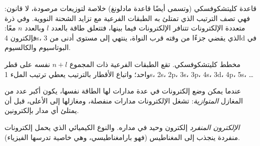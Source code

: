 \begin{remark}\label{rem:b1:quantum-numbers:klech-empirical}
قاعدة كليتشكوفسكي (وتسمى أيضًا قاعدة مادلونغ) خلاصة لتوزيعات مرصودة، لا
قانون: فهي تصف الترتيب الذي تمتلئ به الطبقات الفرعية مع تزايد الشحنة
النووية. وفي ذرة متعددة الإلكترونات تتنافر الإلكترونات فيما بينها،
فتتعلق طاقة  بالعدد $l$ وبالعدد $n$ معًا: فإلكترون 4s، الذي
يقضي جزءًا من وقته قرب النواة، ينتهي إلى مستوى أدنى من 3d في البوتاسيوم والكالسيوم.
\end{remark}

\begin{omfigure}

{\small مخطط كليتشكوفسكي. تقع الطبقات الفرعية ذات المجموع $n + l$ نفسه
على قطر واحد؛ واتباع الأقطار بالترتيب يعطي ترتيب الملء
1s، 2s، 2p، 3s، 3p، 4s، 3d، 4p، 5s، \dots}
\end{omfigure}

\begin{proposition}\label{prop:b1:quantum-numbers:hund}
عندما يمكن وضع إلكترونات  في عدة مدارات لها الطاقة نفسها،
يكون  أكبر عدد من المغازل
\emph{المتوازية}: تشغل الإلكترونات مدارات منفصلة، ومغازلها إلى الأعلى،
قبل أن يمتلئ أي مدار بإلكترونين.
\end{proposition}
\admitted

\begin{definition}\label{def:b1:quantum-numbers:unpaired}
\emph{الإلكترون المنفرد} إلكترون وحيد في مداره.
والنوع الكيميائي الذي يحمل إلكترونات منفردة ينجذب إلى المغناطيس (فهو
بارامغناطيسي، وهي خاصية تدرسها الفيزياء).
\end{definition}


